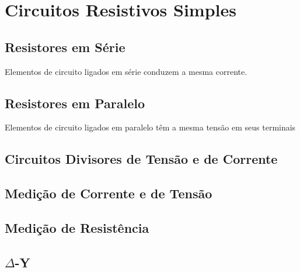 \chapter{Circuitos Resistivos Simples}

\section{Resistores em Série}

Elementos de circuito ligados em série conduzem a mesma corrente.

\section{Resistores em Paralelo}

Elementos de circuito ligados em paralelo têm a mesma tensão em seus terminais

\section{Circuitos Divisores de Tensão e de Corrente}

\section{Medição de Corrente e de Tensão}

\section{Medição de Resistência}

\section{$\Delta$-Y}
